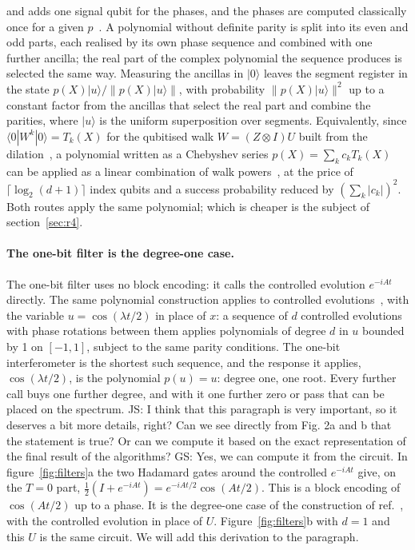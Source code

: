 \documentclass[11pt,a4paper]{article}
\newcommand{\js}[1]{{\color{blue} JS: #1 }}
\newcommand{\gs}[1]{{\color{orange!85!black} GS: #1 }}
\begin{document}
and adds one signal qubit for the phases, and the phases are computed classically once for a given
$p$~\cite{dong2021}. A polynomial without definite parity is split into its even and odd parts, each
realised by its own phase sequence and combined with one further ancilla; the real part of the
complex polynomial the sequence produces is selected the same way. Measuring the ancillas in
$|0\rangle$ leaves the segment register in the state $p(X)|u\rangle/\lVert p(X)|u\rangle\rVert$, with
probability $\lVert p(X)|u\rangle\rVert^2$ up to a constant factor from the ancillas that select the
real part and combine the parities, where $|u\rangle$ is the uniform superposition over segments. Equivalently, since $\langle0|W^k|0\rangle=T_k(X)$ for the qubitised walk $W=(Z\otimes I)U$
built from the dilation~\cite{lowchuang2019}, a polynomial written as a Chebyshev series
$p(X)=\sum_kc_kT_k(X)$ can be applied as a linear combination of walk powers~\cite{childs2012}, at the
price of $\lceil\log_2(d+1)\rceil$ index qubits and a success probability reduced by
$(\sum_k|c_k|)^2$. Both routes apply the same polynomial; which is cheaper is the subject of
section~\ref{sec:r4}.

\paragraph{The one-bit filter is the degree-one case.}
The one-bit filter uses no block encoding: it calls the controlled evolution $e^{-iAt}$ directly.
The same polynomial construction applies to controlled evolutions~\cite{dong2022}, with the
variable $u=\cos(\lambda t/2)$ in place of $x$: a sequence of $d$ controlled evolutions with phase
rotations between them applies polynomials of degree $d$ in $u$ bounded by 1 on $[-1,1]$, subject to the same parity
conditions. The one-bit
interferometer is the shortest such sequence, and the response it applies, $\cos(\lambda t/2)$, is
the polynomial $p(u)=u$: degree one, one root. Every further call buys one further degree, and with
it one further zero or pass that can be placed on the spectrum. \js{I think that this paragraph is very important, so it deserves a bit more details, right? Can we see directly from Fig. 2a and b that the statement is true? Or can we compute it based on the exact representation of the final result of the algorithms?} \gs{Yes, we can compute it from the circuit. In figure~\ref{fig:filters}a the two Hadamard gates around the controlled $e^{-iAt}$ give, on the $T=0$ part, $\tfrac12(I+e^{-iAt})=e^{-iAt/2}\cos(At/2)$. This is a block encoding of $\cos(At/2)$ up to a phase. It is the degree-one case of the construction of ref.~\cite{dong2022}, with the controlled evolution in place of $U$. Figure~\ref{fig:filters}b with $d=1$ and this $U$ is the same circuit. We will add this derivation to the paragraph.} 
\end{document}
